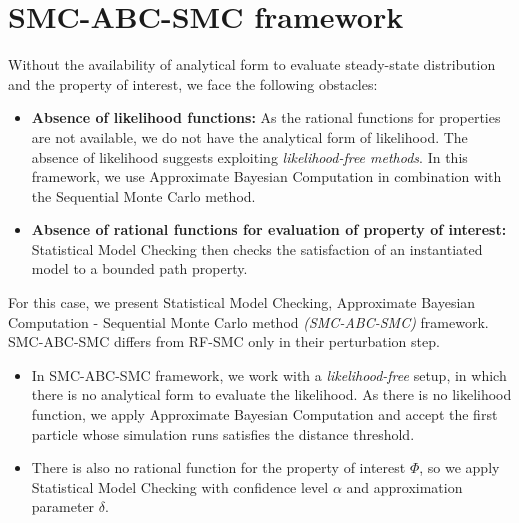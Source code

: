 \section{SMC-ABC-SMC framework}
Without the availability of analytical form to evaluate steady-state distribution and the property of
interest, we face the following obstacles:
\begin{itemize}
    \item \textbf{Absence of likelihood functions:} As the rational functions for properties are not
          available, we do not have the analytical form of likelihood. The absence of likelihood
          suggests exploiting \textit{likelihood-free methods}. In this framework, we use Approximate
          Bayesian Computation in combination with the Sequential Monte Carlo method.
    \item \textbf{Absence of rational functions for evaluation of property of interest:} Statistical
          Model Checking then checks the satisfaction of an instantiated model to a bounded path property.
\end{itemize}
For this case, we present Statistical Model Checking, Approximate Bayesian Computation - Sequential
Monte Carlo method \textit{(SMC-ABC-SMC)} framework. SMC-ABC-SMC differs from RF-SMC only in their
perturbation step.
\begin{itemize}
    \item In SMC-ABC-SMC framework, we work with a \textit{likelihood-free} setup, in which there is
          no analytical form to evaluate the likelihood. As there is no likelihood function, we
          apply Approximate Bayesian Computation and  accept the first particle whose simulation runs
          satisfies the distance threshold.
    \item There is also no rational function for the property of interest $\Phi$, so we apply
          Statistical Model Checking with confidence level $\alpha$ and approximation parameter $\delta$.
\end{itemize}

